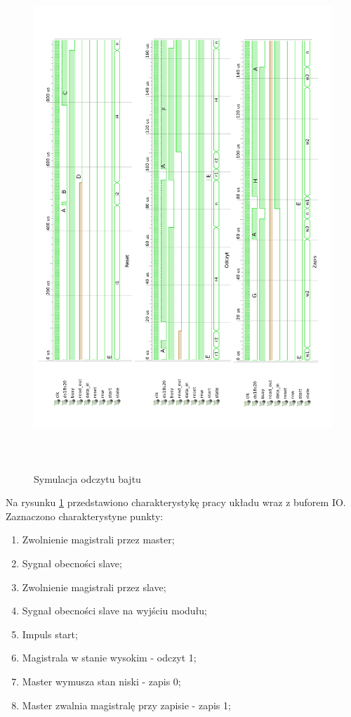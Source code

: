 \documentclass[a4paper]{article}
\begin{document}
\begin{figure}[H]
\begin{center}
\includegraphics[height=19cm]{graphics/bus_controller_symulation.png}
\end{center}
\caption{Symulacja odczytu bajtu}
\label{bus_controller_symulation}
\end{figure}

Na rysunku \ref{bus_controller_symulation} przedstawiono charakterystykę pracy układu wraz z buforem IO. Zaznaczono charakterystyne punkty:
\begin{enumerate}[label=\Alph*]
\item Zwolnienie magistrali przez master;
\item Sygnał obecności slave;
\item Zwolnienie magistrali przez slave;
\item Sygnał obecności slave na wyjściu modułu;
\item Impuls start;
\item Magistrala w stanie wysokim - odczyt 1;
\item Master wymusza stan niski - zapis 0;
\item Master zwalnia magistralę przy zapisie - zapis 1;
\end{enumerate}
\end{document}

